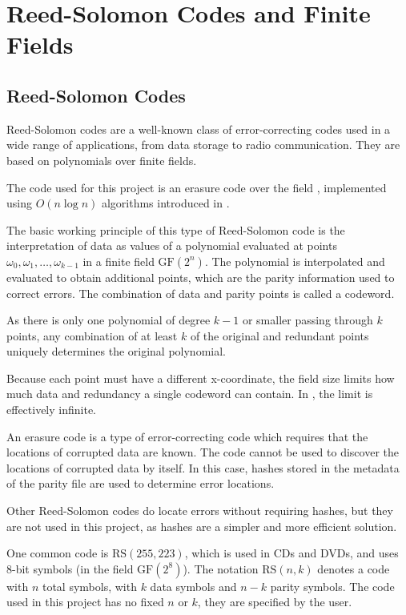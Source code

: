 \chapter{Reed-Solomon Codes and Finite Fields}

\section{Reed-Solomon Codes}

Reed-Solomon codes are a well-known class of error-correcting codes used in a wide range of applications, from data storage to radio communication.
They are based on polynomials over finite fields. \cite{theory-of-error-correcting-codes}

The code used for this project is an erasure code over the field , implemented using $O(n \log n)$ algorithms introduced in \cite{novel-poly}.

The basic working principle of this type of Reed-Solomon code is the interpretation of data as values of a polynomial evaluated at points ${\omega_0, \omega_1, \ldots, \omega_{k - 1}}$ in a finite field $\text{GF}(2^n)$.
The polynomial is interpolated and evaluated to obtain additional points, which are the parity information used to correct errors.
The combination of data and parity points is called a codeword.

As there is only one polynomial of degree $k - 1$ or smaller passing through $k$ points, any combination of at least $k$ of the original and redundant points uniquely determines the original polynomial.

Because each point must have a different x-coordinate, the field size limits how much data and redundancy a single codeword can contain. In , the limit is effectively infinite.

An erasure code is a type of error-correcting code which requires that the locations of corrupted data are known.
The code cannot be used to discover the locations of corrupted data by itself.
In this case, hashes stored in the metadata of the parity file are used to determine error locations.

Other Reed-Solomon codes do locate errors without requiring hashes, but they are not used in this project, as hashes are a simpler and more efficient solution.

One common code is $\text{RS}(255, 223)$, which is used in CDs and DVDs, and uses 8-bit symbols (in the field $\text{GF}(2^8)$).
The notation $\text{RS}(n, k)$ denotes a code with $n$ total symbols, with $k$ data symbols and $n - k$ parity symbols.
The code used in this project has no fixed $n$ or $k$, they are specified by the user.

